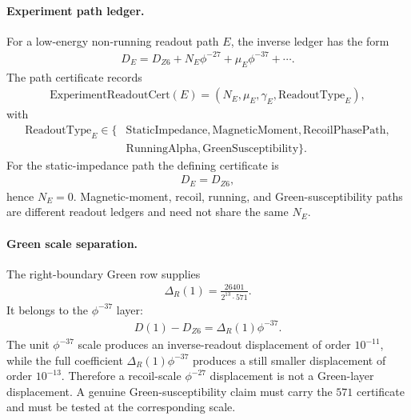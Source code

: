 \paragraph{Experiment path ledger.}
For a low-energy non-running readout path $E$, the inverse ledger has the form
$$
\begin{aligned}
D_E
=
D_{Z6}
+N_E\phi^{-27}
+\mu_E\phi^{-37}
+\cdots .
\end{aligned}
$$
The path certificate records
$$
\begin{aligned}
\mathrm{ExperimentReadoutCert}(E)
=
\left(N_E,\mu_E,\gamma_E,\mathrm{ReadoutType}_E\right),
\end{aligned}
$$
with
$$
\begin{aligned}
\mathrm{ReadoutType}_E\in
\{&
\mathrm{StaticImpedance},
\mathrm{MagneticMoment},
\mathrm{RecoilPhasePath},\\
&\mathrm{RunningAlpha},
\mathrm{GreenSusceptibility}\}.
\end{aligned}
$$
For the static-impedance path the defining certificate is
$$
\begin{aligned}
D_E=D_{Z6},
\end{aligned}
$$
hence $N_E=0$.  Magnetic-moment, recoil, running, and Green-susceptibility paths are different readout ledgers and need not share the same $N_E$.

\paragraph{Green scale separation.}
The right-boundary Green row supplies
$$
\begin{aligned}
\Delta_R(1)=\frac{26401}{2^{13}\cdot 571}.
\end{aligned}
$$
It belongs to the $\phi^{-37}$ layer:
$$
\begin{aligned}
D(1)-D_{Z6}=\Delta_R(1)\phi^{-37}.
\end{aligned}
$$
The unit $\phi^{-37}$ scale produces an inverse-readout displacement of order $10^{-11}$, while the full coefficient $\Delta_R(1)\phi^{-37}$ produces a still smaller displacement of order $10^{-13}$.  Therefore a recoil-scale $\phi^{-27}$ displacement is not a Green-layer displacement.  A genuine Green-susceptibility claim must carry the $571$ certificate and must be tested at the corresponding scale.

